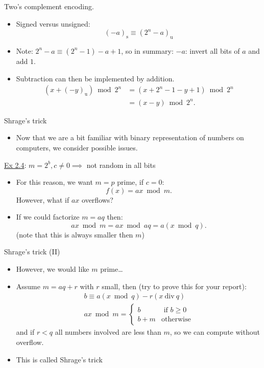 \documentclass[10pt]{beamer}
\begin{document}
\begin{frame}[label={sec:org3655398}]{Two's complement encoding.}
\begin{itemize}
\item Signed versus unsigned:
$$(-a)_\text{s} \equiv (2^n - a)_{\text{u}}$$
\item \alert{Note:} \(2^n - a \equiv (2^n - 1) - a + 1\), so in \alert{summary}: \(-a\): invert all
bits of \(a\) and add \(1\).
\item Subtraction can then be implemented by addition.
\begin{align*}
(x + (-y)_{\text{u}}) \bmod 2^n &= (x + 2^n - 1 - y + 1) \bmod 2^n\\
&= (x - y) \bmod 2^n.
\end{align*}
\end{itemize}
\end{frame}
\begin{frame}[label={sec:org846e110}]{Shrage's trick}
\begin{itemize}
\item Now that we are a bit familiar with binary representation of numbers on computers, we consider possible issues.
\end{itemize}

\uline{Ex 2.4}: \(m = 2^b, c \neq 0 \implies\) not random in all bits

\begin{itemize}
\item For this reason, we want \(m = p\) prime, if \(c = 0\):
$$f(x) = ax \bmod m.$$
However, what if \(ax\) \alert{overflows}?
\item If we could factorize \(m = aq\) then:
$$ax \bmod m = ax \bmod aq = a (x \bmod q).$$
(note that this is always smaller then \(m\))
\end{itemize}
\end{frame}
\begin{frame}[label={sec:org289aeda}]{Shrage's trick (II)}
\begin{itemize}
\item However, we would like \(m\) prime\ldots{}
\item Assume \(m = aq + r\) with \(r\) small, then (try to prove this for your report):
\begin{align*}
b \equiv a (x \bmod q) - r (x~\text{div}~q) \\
ax \bmod m = \begin{cases}
b & \text{ if } b \geq 0 \\
b + m & \text{otherwise}
\end{cases}
\end{align*}
and if \(r < q\) all numbers involved are less than \(m\), so we can compute without overflow.
\item This is called \alert{Shrage's trick}
\end{itemize}
\end{frame}
\end{document}
